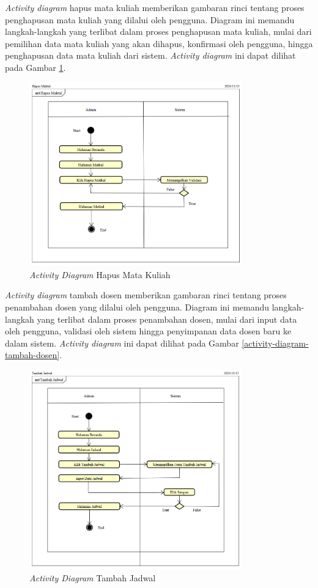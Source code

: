 \textit{Activity diagram} hapus mata kuliah memberikan gambaran rinci tentang proses penghapusan mata kuliah yang dilalui oleh pengguna. Diagram ini memandu langkah-langkah yang terlibat dalam proses penghapusan mata kuliah, mulai dari pemilihan data mata kuliah yang akan dihapus, konfirmasi oleh pengguna, hingga penghapusan data mata kuliah dari sistem. \textit{Activity diagram} ini dapat dilihat pada Gambar \ref{activity-diagram-hapus-matkul}.
\begin{figure}
	\centering
	\includegraphics[width=0.82\textwidth]{konten/gambar/activity-diagram/hapus-matkul.png}
	\caption{\textit{Activity Diagram} Hapus Mata Kuliah}
	\label{activity-diagram-hapus-matkul}
\end{figure}

\textit{Activity diagram} tambah dosen memberikan gambaran rinci tentang proses penambahan dosen yang dilalui oleh pengguna. Diagram ini memandu langkah-langkah yang terlibat dalam proses penambahan dosen, mulai dari input data oleh pengguna, validasi oleh sistem hingga penyimpanan data dosen baru ke dalam sistem. \textit{Activity diagram} ini dapat dilihat pada Gambar \ref{activity-diagram-tambah-dosen}.
\begin{figure}
	\centering
	\includegraphics[width=0.82\textwidth]{konten/gambar/activity-diagram/tambah-jadwal.png}
	\caption{\textit{Activity Diagram} Tambah Jadwal}
	\label{activity-diagram-tambah-jadwal}
\end{figure}


